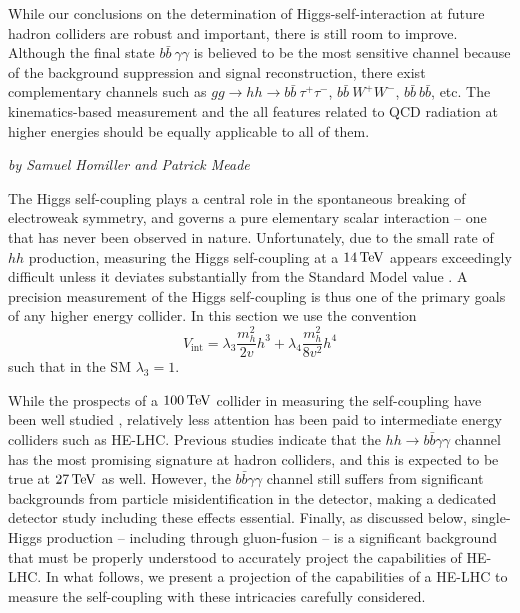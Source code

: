 While our conclusions on the determination of Higgs-self-interaction
at future hadron colliders are robust and important, there is still
room to improve. Although the final state $b\bar b\ \gamma\gamma$ is
believed to be the most sensitive channel because of the background
suppression and signal reconstruction, there exist complementary
channels such as ${gg\to hh \to b\bar b\ \tau^+\tau^-}$, $b\bar
b\ W^+W^-$, $b\bar b\ b\bar b$, etc. The kinematics-based measurement
and the all features related to QCD radiation at higher energies
should be equally applicable to all of them.


\begin{center}
\textit{by Samuel Homiller and Patrick Meade}
\end{center}

The Higgs self-coupling plays a central role in the spontaneous breaking of electroweak symmetry, and governs a pure elementary scalar interaction -- one that has never been observed in nature. Unfortunately, due to the small rate of $hh$ production, measuring the Higgs self-coupling at a $14\, {\rm TeV}$ appears exceedingly difficult unless it deviates substantially from the Standard Model value \cite{ATL-PHYS-PUB-2014-019, ATL-PHYS-PUB-2017-001}. A precision measurement of the Higgs self-coupling is thus one of the primary goals of any higher energy collider.  In this section we use the convention
\begin{equation}\label{eq:v_int}
  V_{\text{int}} = \lambda_3\frac{m_h^2}{2v}h^3 + \lambda_4\frac{m_h^2}{8v^2}h^4
\end{equation}
such that in the SM $\lambda_3=1$.

While the prospects of a $100\, {\rm TeV}$ collider in measuring the self-coupling have been well studied \cite{Contino:2016spe}, relatively less attention has been paid to intermediate energy colliders such as HE-LHC. Previous studies indicate that the $hh\rightarrow b\bar{b}\gamma\gamma$ channel has the most promising signature at hadron colliders, and this is expected to be true at $27\, {\rm TeV}$ as well. However, the $b\bar{b}\gamma\gamma$ channel still suffers from significant backgrounds from particle misidentification in the detector, making a dedicated detector study including these effects essential. Finally, as discussed below, single-Higgs production -- including through gluon-fusion -- is a significant background that must be properly understood to accurately project the capabilities of HE-LHC. In what follows, we present a projection of the capabilities of a HE-LHC to measure the self-coupling with these intricacies carefully considered.

